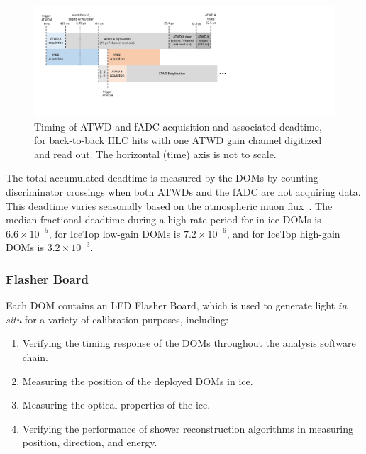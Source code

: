 \begin{figure}[]
 \centering
 \includegraphics[width=1.0\textwidth]{graphics/dom/functional/atwd_timing.pdf}
 \caption{Timing of ATWD and fADC acquisition and associated deadtime, for
   back-to-back HLC hits with one ATWD gain channel digitized and read out.  The
   horizontal (time) axis is not to scale.}
 \label{fig:atwd_timing}
\end{figure}

The total accumulated deadtime is measured by the DOMs by counting
discriminator crossings when both ATWDs and the fADC are not acquiring
data. This deadtime varies seasonally based on the atmospheric muon
flux~\cite{ICECUBE:IceTop}.  The median fractional deadtime during a
high-rate period for in-ice DOMs 
is $6.6\times10^{-5}$, for IceTop low-gain DOMs is $7.2\times 10^{-6}$, and
for IceTop high-gain DOMs is $3.2 \times 10^{-3}$.  

\subsubsection{\label{sec:flasher}Flasher Board}

Each DOM contains an LED Flasher Board, which is used to generate
light \emph{in situ} for a
variety of calibration purposes, including: 

\begin{enumerate}
\item Verifying the timing response of the DOMs throughout the analysis
  software chain.
\item Measuring the position of the deployed DOMs in ice.
\item Measuring the optical properties of the ice.
\item Verifying the performance of shower reconstruction algorithms
  in measuring position, direction, and energy.
\end{enumerate}


